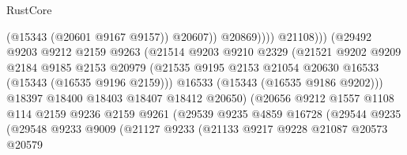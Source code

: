 \begin{lexlean}{RustCore}
\begin{coremodule}
                                              (@15343 (@20601 @9167 @9157))
                                              @20607))
                                          @20869))))
                                  @21108)))
                            (@29492
                              @9203
                              @9212
                              @2159
                              @9263
                              (@21514
                                @9203
                                @9210
                                @2329
                                (@21521
                                  @9202
                                  @9209
                                  @2184
                                  @9185
                                  @2153
                                  @20979
                                  (@21535
                                    @9195
                                    @2153
                                    @21054
                                    @20630
                                    @16533
                                    (@15343 (@16535 @9196 @2159)))
                                  @16533
                                  (@15343 (@16535 @9186 @9202)))
                                @18397
                                @18400
                                @18403
                                @18407
                                @18412
                                @20650)
                              (@20656
                                @9212
                                @1557
                                @1108
                                @114
                                @2159
                                @9236
                                @2159
                                @9261
                                (@29539
                                  @9235
                                  @4859
                                  @16728
                                  (@29544
                                    @9235
                                    (@29548
                                      @9233
                                      @9009
                                      (@21127
                                        @9233
                                        (@21133
                                          @9217
                                          @9228
                                          @21087
                                          @20573
                                          @20579

\end{coremodule}
\end{lexlean}
